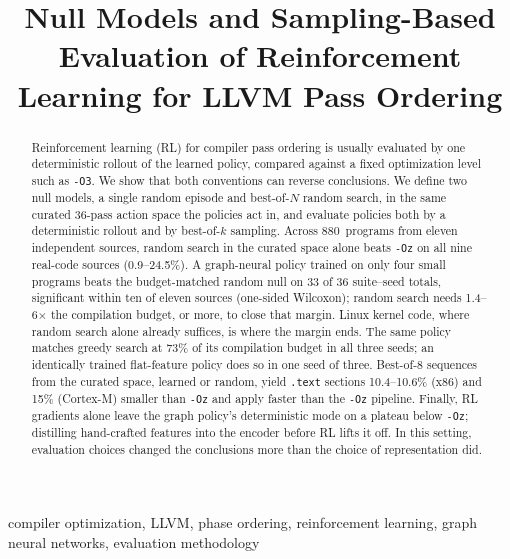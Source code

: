 \documentclass[conference,a4paper]{IEEEtran}
\begin{document}
\title{Null Models and Sampling-Based Evaluation of
Reinforcement Learning for LLVM Pass Ordering}

\author{
}

\maketitle

\begin{abstract}
Reinforcement learning (RL) for compiler pass ordering is usually
evaluated by one deterministic rollout of the learned policy, compared
against a fixed optimization level such as \texttt{-O3}. We show that
both conventions can reverse conclusions. We define two null models, a
single random episode and best-of-$N$ random search, in the same
curated 36-pass action space the policies act in, and evaluate
policies both by a deterministic rollout and by best-of-$k$ sampling.
Across 880~programs from eleven independent sources, random search in
the curated space alone beats \texttt{-Oz} on all nine real-code
sources (0.9--24.5\%). A graph-neural policy trained on only four small
programs beats the budget-matched random null on 33 of 36 suite--seed
totals, significant within ten of eleven sources (one-sided Wilcoxon);
random search needs 1.4--6$\times$ the compilation budget, or more, to
close that margin. Linux kernel code, where random search alone
already suffices, is where the margin ends. The
same policy matches greedy search at 73\% of its
compilation budget in all three seeds; an identically trained
flat-feature policy does so in one seed of three. Best-of-8 sequences
from the curated space, learned or random, yield \texttt{.text} sections
10.4--10.6\% (x86) and 15\% (Cortex-M) smaller than \texttt{-Oz} and
apply faster than the \texttt{-Oz} pipeline. Finally, RL gradients
alone leave the graph policy's deterministic mode on a plateau below
\texttt{-Oz}; distilling hand-crafted features into the encoder before
RL lifts it off. In this setting, evaluation choices changed the
conclusions more than the choice of representation did.
\end{abstract}

\begin{IEEEkeywords}
compiler optimization, LLVM, phase ordering, reinforcement learning,
graph neural networks, evaluation methodology
\end{IEEEkeywords}
\end{document}

